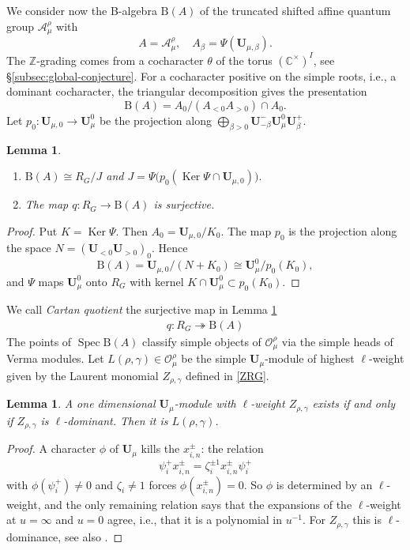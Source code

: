 \documentclass[11pt,reqno]{amsart}
\newtheorem{Lemma}[Theorem]{Lemma}
\theoremstyle{definition}
\theoremstyle{remark}
\def\scrO{\mathscr O}
\def\B{\mathrm B}
\def\calA{\mathcal A}
\def\bfU{\mathbf U}
\def\Spec{\operatorname{Spec}}
\def\Ker{\operatorname{Ker}}
\begin{document}
We consider now the B-algebra $\B(A)$ of the truncated shifted affine quantum group $\calA^\rho_\mu$ with
$$A=\calA^\rho_\mu,\quad A_\beta=\Psi(\bfU_{\mu,\beta}).$$
The $\mathbb Z$-grading comes from a cocharacter $\theta$ of
 the torus $(\mathbb C^\times)^I$, see \S\ref{subsec:global-conjecture}.
For a cocharacter positive on the simple roots, i.e., a dominant cocharacter, the triangular
decomposition gives the presentation
\[
\B(A)=A_0\big/(A_{<0}A_{>0})\cap A_0.
\]
Let $p_0:\bfU_{\mu,0}\to\bfU^0_\mu$ be the projection along $\bigoplus_{\beta>0}\bfU^-_{-\beta}\bfU^0_\mu\bfU^+_\beta$. 

\begin{Lemma}\label{lem:Bpres}\hfill
\begin{enumerate}[label=$\mathrm{(\alph*)}$,leftmargin=8mm]
\item $\B(A)\cong R_G/J$ and $J=\Psi\big(p_0(\Ker\Psi\cap\bfU_{\mu,0})\big).$ 
\item The map $q:R_G\to\B(A)$ is surjective. 
\end{enumerate}
\end{Lemma}

\begin{proof}
Put $K=\Ker\Psi$. Then $A_0=\bfU_{\mu,0}/K_0$. 
The map $p_0$ is the projection along the space $N=(\bfU_{<0}\bfU_{>0})_0$. 
Hence 
$$\B(A)=\bfU_{\mu,0}/(N+K_0)\cong\bfU^0_\mu/p_0(K_0),$$ and
$\Psi$ maps $\bfU^0_\mu$ onto $R_G$ with kernel $K\cap\bfU^0_\mu\subset p_0(K_0)$.
\end{proof}

We call \emph{Cartan quotient} the surjective map in Lemma \ref{lem:Bpres}
\begin{align}\label{CQ} q:R_G\twoheadrightarrow \B(A)
\end{align}
The points of $\Spec\B(A)$ classify simple objects of $\scrO_\mu^\rho$ via the simple heads of Verma modules. 
Let $L(\rho,\gamma)\in\scrO_\mu^\rho$ 
be the simple $\bfU_\mu$-module of highest $\ell$-weight given by the Laurent monomial $Z_{\rho,\gamma}$
defined in \eqref{ZRG}.


\begin{Lemma}\label{lem:onedim}
A one dimensional $\bfU_\mu$-module
with $\ell$-weight $Z_{\rho,\gamma}$ exists if and only if $Z_{\rho,\gamma}$ is $\ell$-dominant.
Then it is $L(\rho,\gamma)$.
\end{Lemma}

\begin{proof}
A character $\phi$ of $\bfU_\mu$ kills the $x^\pm_{i,n}$: the relation 
$$\psi^+_ix^\pm_{i,n}=\zeta_i^{\pm1}x^\pm_{i,n}\psi^+_i$$ with
$\phi(\psi^+_i)\neq0$ and $\zeta_i\neq1$ forces $\phi(x^\pm_{i,n})=0$. So $\phi$ is determined by an $\ell$-weight, and the only
remaining relation says that the expansions of the $\ell$-weight at $u=\infty$ and $u=0$ agree, i.e., that it is a
polynomial in $u^{-1}$. For $Z_{\rho,\gamma}$ this is $\ell$-dominance, see also \cite[Thm.~5.5]{H23}.
\end{proof}
\end{document}
